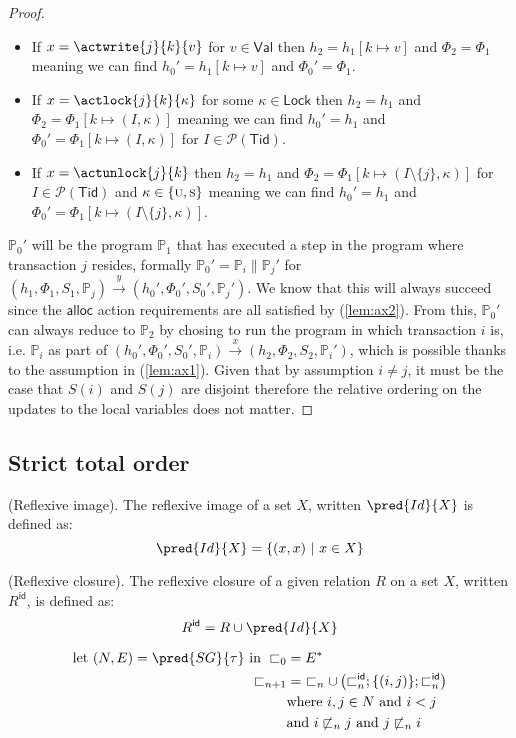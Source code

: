 \begin{proof}
\begin{itemize}
	\item If $x = \actwrite{j}{k}{v}$ for $v \in \mathsf{Val}$ then $h_2 = h_1[k \mapsto v]$ and $\Phi_2 = \Phi_1$ meaning we can find $h_0' = h_1[k \mapsto v]$ and $\Phi_0' = \Phi_1$.
	
	\item If $x = \actlock{j}{k}{\kappa}$ for some $\kappa \in \mathsf{Lock}$ then $h_2 = h_1$ and $\Phi_2 = \Phi_1[k \mapsto (I, \kappa)]$ meaning we can find $h_0' = h_1$ and $\Phi_0' = \Phi_1[k \mapsto (I, \kappa)]$ for $I \in \mathcal{P}(\mathsf{Tid})$.
	
	\item If $x = \actunlock{j}{k}$ then $h_2 = h_1$ and $\Phi_2 = \Phi_1[k \mapsto (I \setminus \{j\}, \kappa)]$ for $I \in \mathcal{P}(\mathsf{Tid})$ and $\kappa \in \{\textsc{u}, \textsc{s}\}$ meaning we can find $h_0' = h_1$ and $\Phi_0' = \Phi_1[k \mapsto (I \setminus \{j\}, \kappa)]$.
\end{itemize}
$\mathds{P}_0'$ will be the program $\mathds{P}_1$ that has executed a step in the program where transaction $j$ resides, formally $\mathds{P}_0' = \mathds{P}_i \| \mathds{P}_j'$ for $(h_1, \Phi_1, S_1, \mathds{P}_j) \xrightarrow{y} (h_0', \Phi_0', S_0', \mathds{P}_j')$. We know that this will always succeed since the $\mathsf{alloc}$ action requirements are all satisfied by (\ref{lem:ax2}). From this, $\mathds{P}_0'$ can always reduce to $\mathds{P}_2$ by chosing to run the program in which transaction $i$ is, i.e. $\mathds{P}_i$ as part of $(h_0', \Phi_0', S_0', \mathds{P}_i) \xrightarrow{x} (h_2, \Phi_2, S_2, \mathds{P}_i')$, which is possible thanks to the assumption in (\ref{lem:ax1}). Given that by assumption $i \neq j$, it must be the case that $S(i)$ and $S(j)$ are disjoint therefore the relative ordering on the updates to the local variables does not matter.
\end{proof}

\subsection{Strict total order}

 (Reflexive image). The reflexive image of a set $X$, written $\pred{Id}{X}$ is defined as:
\[
	\pred{Id}{X} = \{ (x, x)\ |\ x \in X \}
\]

 (Reflexive closure). The reflexive closure of a given relation $R$ on a set $X$, written $R^\mathsf{id}$, is defined as:
\[
	R^\mathsf{id} = R \cup \pred{Id}{X}
\]

\begin{align*}
	\text{let } (N, E) = \pred{SG}{\tau} \text{ in }
	\sqsubset_0 &= E^* \\
	\sqsubset_{n + 1} &=\ \sqsubset_n \cup \left( \sqsubset_n^\mathsf{id} ; \{ (i, j) \} ; \sqsubset_n^\mathsf{id} \right) \\
	&\text{where } i, j \in N \text{ and } i < j \\
	&\text{and } i \not\sqsubset_n j \text{ and } j \not\sqsubset_n i
\end{align*}

